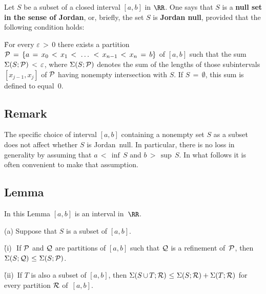 \V

        Let $S$ be a subset of a closed interval $[a,b]$ in ${\RR}$. One says that $S$ is a {\bf null set in the sense of Jordan},
    or, briefly, the set $S$ is {\bf Jordan null}, provided that the following condition holds:


        \h For every ${\varepsilon}\,>\,0$ there exists a partition ${\cal P} \,=\, \{a \,=\, x_{0}\,<\,x_{1}\,<\,\,{\ldots}\,\,<\,x_{n-1}\,<\,x_{n} \,=\, b\}$
    of $[a,b]$ such that the sum ${\Sigma}(S;{\cal P})\,<\,{\varepsilon}$, where ${\Sigma}(S;{\cal P})$ denotes the sum of the lengths of those subintervals
    $[x_{j-1},x_{j}]$ of ${\cal P}$ having nonempty intersection with $S$. If $S \,=\, {\emptyset}$, this sum is defined to equal~$0$.

\VA

        \subsection{\small{{\bf Remark}}}
        \label{RemrkH20.55A}

\V

\hspace*{\parindent} The specific choice of interval $[a,b]$ containing a nonempty set $S$ as a subset does not affect whether $S$ is Jordan~null.
    In particular, there is no loss in generality by assuming that $a\,<\,{\inf}\,S$ and $b\,>\,{\sup}\,S$. In what follows it is often convenient to make that assumption.
        
\V

        \subsection{\small{{\bf Lemma}}}
        \label{LemmaH20.55B}

\V

        In this Lemma $[a,b]$ is an interval in~${\RR}$.

\V

        (a) Suppose that $S$ is a subset of $[a,b]$.

\VA

      \h  (i)\,\, If ${\cal P}$ and ${\cal Q}$ are partitions of $[a,b]$ such that 
${\cal Q}$ is a refinement of~${\cal P}$, then ${\Sigma}(S;{\cal Q})\,\,{\leq}\,\,{\Sigma}(S;{\cal P})$.

\VA

      \h  (ii)\, If $T$ is also a subset of $[a,b]$, then ${\Sigma}(S\,{\cup}\,T;{\cal R})\,\,{\leq}\,\,{\Sigma}(S;{\cal R}) + {\Sigma}(T;{\cal R})$ for every partition ${\cal R}$ of~$[a,b]$.

